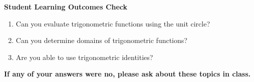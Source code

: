 \noindent \textbf{Student Learning Outcomes Check}

\begin{enumerate}
\item Can you evaluate trigonometric functions using the unit circle?
\item Can you determine domains of trigonometric functions?
\item Are you able to use trigonometric identities?

\end{enumerate}

\noindent \textbf{If any of your answers were no, please ask about these topics in class.}


